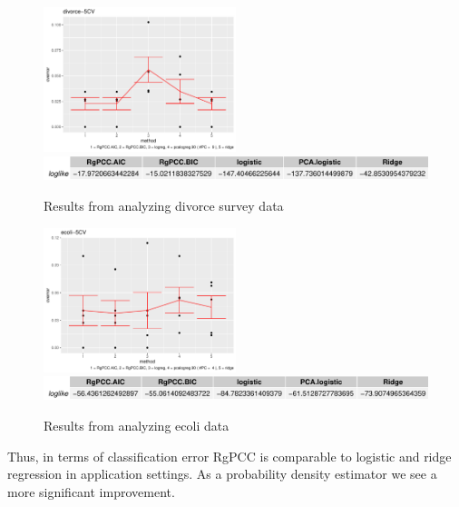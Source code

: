 \documentclass[main.tex]{subfiles}
\begin{document}
\begin{figure}[H]
	\centering
	
	\includegraphics[width = 0.5\textwidth]{R-code/data/divorce-5CVgraph.pdf}
	\includegraphics[width = \textwidth]{R-code/data/divorce-5CVloglike.pdf}
	\label{fig:divorce}
	\caption{Results from analyzing divorce survey data}
\end{figure}

\begin{figure}[H]
	\centering
	
	\includegraphics[width = 0.5\textwidth]{R-code/data/ecoli-5CVgraph.pdf}
	\includegraphics[width = \textwidth]{R-code/data/ecoli-5CVloglike.pdf}
	\label{fig:ecoli}
	\caption{Results from analyzing ecoli data}
\end{figure}

Thus, in terms of classification error RgPCC is comparable to logistic and ridge regression in application settings. As a probability density estimator we see a more significant improvement.
\end{document}
